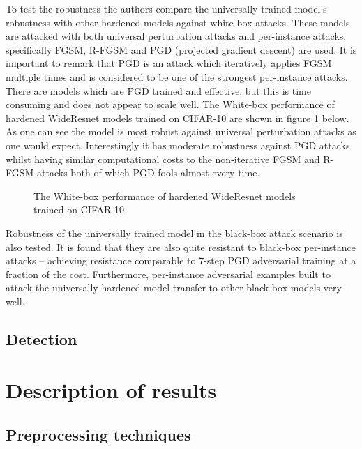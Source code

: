 \documentclass[12pt]{article}
\begin{document}
To test the robustness the authors compare the universally trained model's robustness with other hardened models against white-box attacks. These models are attacked with both universal perturbation attacks and per-instance attacks, specifically FGSM, R-FGSM and PGD (projected gradient descent) are used. It is important to remark that PGD is an attack which iteratively applies FGSM multiple times and is considered to be one of the strongest per-instance attacks. There are models which are PGD trained and effective, but this is time consuming and does not appear to scale well. The White-box performance of hardened WideResnet models trained on CIFAR-10 are shown in figure \ref{table} below.
As one can see the model is most robust against universal perturbation attacks as one would expect. Interestingly it has moderate robustness against PGD attacks whilst having similar computational costs to the non-iterative FGSM and R-FGSM attacks both of which PGD fools almost every time. 
\begin{figure}[b] \label{table}
\caption{ The White-box performance of hardened WideResnet models trained on CIFAR-10}
\centering
\end{figure}


Robustness of the universally trained model in the black-box attack scenario is also tested. It is found that they are also quite resistant to black-box per-instance attacks – achieving resistance comparable to 7-step PGD adversarial training at a fraction of the cost. Furthermore, per-instance adversarial examples built to attack the universally hardened model transfer to other black-box models very well.

\subsection{Detection}

\section{Description of results}

\subsection{Preprocessing techniques}
\end{document}

